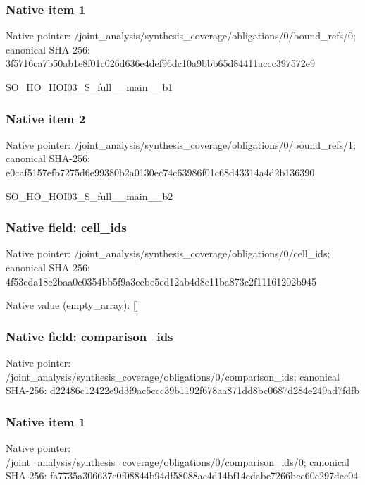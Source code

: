 \documentclass[10pt,a4paper]{article}
\begin{document}
\subsubsection{Native item 1}
Native pointer: /joint\_\allowbreak{}analysis/synthesis\_\allowbreak{}coverage/obligations/0/bound\_\allowbreak{}refs/0; canonical SHA-256: 3f5716ca7b50ab1e8f01c026d636e4def96dc10a9bbb65d84411accc397572e9

\begingroup\raggedright\sloppy SO\_\allowbreak{}HO\_\allowbreak{}HOI03\_\allowbreak{}S\_\allowbreak{}full\_\allowbreak{}\_\allowbreak{}main\_\allowbreak{}\_\allowbreak{}b1\par\endgroup

\subsubsection{Native item 2}
Native pointer: /joint\_\allowbreak{}analysis/synthesis\_\allowbreak{}coverage/obligations/0/bound\_\allowbreak{}refs/1; canonical SHA-256: e0caf5157efb7275d6e99380b2a0130ec74c63986f01c68d43314a4d2b136390

\begingroup\raggedright\sloppy SO\_\allowbreak{}HO\_\allowbreak{}HOI03\_\allowbreak{}S\_\allowbreak{}full\_\allowbreak{}\_\allowbreak{}main\_\allowbreak{}\_\allowbreak{}b2\par\endgroup

\subsubsection{Native field: cell\_\allowbreak{}ids}
Native pointer: /joint\_\allowbreak{}analysis/synthesis\_\allowbreak{}coverage/obligations/0/cell\_\allowbreak{}ids; canonical SHA-256: 4f53cda18c2baa0c0354bb5f9a3ecbe5ed12ab4d8e11ba873c2f11161202b945

Native value (empty\_\allowbreak{}array): []

\subsubsection{Native field: comparison\_\allowbreak{}ids}
Native pointer: /joint\_\allowbreak{}analysis/synthesis\_\allowbreak{}coverage/obligations/0/comparison\_\allowbreak{}ids; canonical SHA-256: d22486c12422e9d3f9ac5ccc39b1192f678aa871dd8bc0687d284e249ad7fdfb

\subsubsection{Native item 1}
Native pointer: /joint\_\allowbreak{}analysis/synthesis\_\allowbreak{}coverage/obligations/0/comparison\_\allowbreak{}ids/0; canonical SHA-256: fa7735a306637e0f08844b94df58088ac4d14bf14cdabe7266bec60c297dcc04
\end{document}
